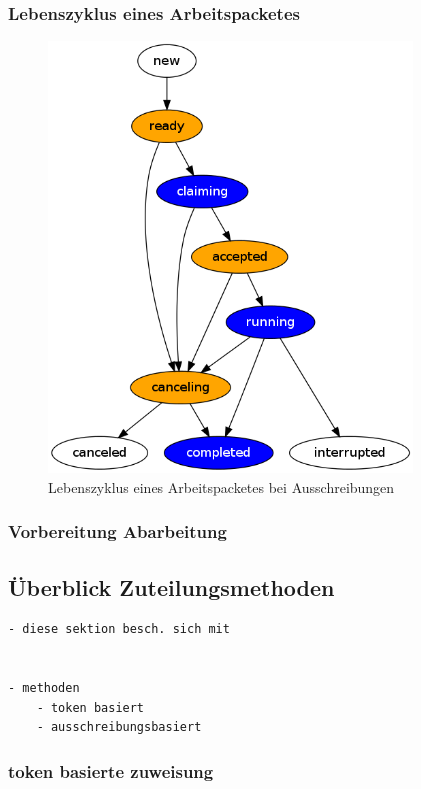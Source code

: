 \subsubsection{Lebenszyklus eines Arbeitspacketes}


\begin{figure}[ht] 
  \centering
  \label{fig:lebenszyklus-arbeitspaket}
  \includegraphics[height=4.5in]{imageinput/lebenszyklus-arbeitspaket.png}
  \caption{Lebenszyklus eines Arbeitspacketes bei Ausschreibungen}
\end{figure}


\subsubsection{Vorbereitung Abarbeitung}

\subsection{\"Uberblick Zuteilungsmethoden}


\begin{verbatim}
- diese sektion besch. sich mit


- methoden
    - token basiert
    - ausschreibungsbasiert

\end{verbatim}


\subsubsection{token basierte zuweisung}

